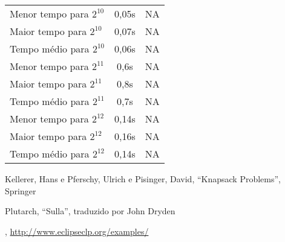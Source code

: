 \documentclass{article}
\begin{document}
\begin{center}
\begin{tabular}{| l | c | c |}
      Menor tempo para $2^{10}$ & 0,05s & NA \\
      Maior tempo para $2^{10}$ & 0,07s & NA \\
      Tempo médio para $2^{10}$ & 0,06s & NA \\
      \hline

      Menor tempo para $2^{11}$ & 0,6s & NA \\
      Maior tempo para $2^{11}$ & 0,8s & NA \\
      Tempo médio para $2^{11}$ & 0,7s & NA \\
      \hline

      Menor tempo para $2^{12}$ & 0,14s & NA \\
      Maior tempo para $2^{12}$ & 0,16s & NA \\
      Tempo médio para $2^{12}$ & 0,14s & NA \\
      \hline
    \end{tabular}
    \egroup
  \end{center}


  \begin{thebibliography}{2}

    Kellerer, Hans e Pferschy, Ulrich e Pisinger, David,
    ``Knapsack Problems'', Springer

    Plutarch,
    ``Sulla'', traduzido por John Dryden

    \eclipse,
    \url{http://www.eclipseclp.org/examples/}

  \end{thebibliography}
\end{document}
